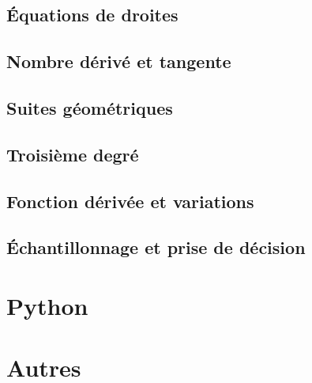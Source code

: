 \documentclass[a4paper,12pt]{book}
\begin{document}
\chapter{Équations de droites}


\chapter{Nombre dérivé et tangente}


\chapter{Suites géométriques}


\chapter{Troisième degré}


\chapter{Fonction dérivée et variations}


\chapter{Échantillonnage et prise de décision}



\part{Python}


\part{Autres}

%






\printindex
\end{document}

